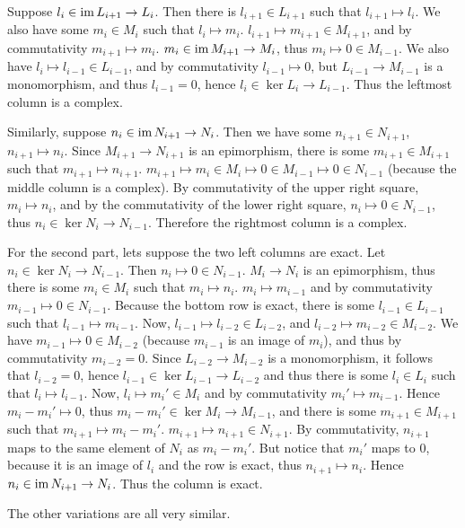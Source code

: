 \begin{solution}
	Suppose $l_i \in \operatorname{im} L_{i+1} \to L_i$. Then there is $l_{i+1} \in L_{i+1}$ such that $l_{i+1} \mapsto l_i$. We also have some $m_i \in M_i$ such that $l_i \mapsto m_i$. $l_{i+1} \mapsto m_{i+1} \in M_{i+1}$, and by commutativity $m_{i+1} \mapsto m_i$. $m_i \in \operatorname{im} M_{i+1} \to M_i$, thus $m_i \mapsto 0 \in M_{i-1}$. We also have $l_i \mapsto l_{i-1} \in L_{i-1}$, and by commutativity $l_{i-1} \mapsto 0$, but $L_{i-1} \to M_{i-1}$ is a monomorphism, and thus $l_{i-1} = 0$, hence $l_i \in \ker L_i \to L_{i-1}$. Thus the leftmost column is a complex.
	
	Similarly, suppose $n_i \in \operatorname{im} N_{i+1} \to N_i$. Then we have some $n_{i+1} \in N_{i+1}$, $n_{i+1} \mapsto n_i$. Since $M_{i+1} \to N_{i+1}$ is an epimorphism, there is some $m_{i+1} \in M_{i+1}$ such that $m_{i+1} \mapsto n_{i+1}$. $m_{i+1} \mapsto m_i \in M_i \mapsto 0 \in M_{i-1} \mapsto 0 \in N_{i-1}$ (because the middle column is a complex). By commutativity of the upper right square, $m_i \mapsto n_i$, and by the commutativity of the lower right square, $n_i \mapsto 0 \in N_{i-1}$, thus $n_i \in \ker N_i \to N_{i-1}$. Therefore the rightmost column is a complex.
	
	For the second part, lets suppose the two left columns are exact. Let $n_i \in \ker N_i \to N_{i-1}$. Then $n_i \mapsto 0 \in N_{i-1}$. $M_i \to N_i$ is an epimorphism, thus there is some $m_i \in M_i$ such that $m_i \mapsto n_i$. $m_i \mapsto m_{i-1}$ and by commutativity $m_{i-1} \mapsto 0 \in N_{i-1}$. Because the bottom row is exact, there is some $l_{i-1} \in L_{i-1}$ such that $l_{i-1} \mapsto m_{i-1}$. Now, $l_{i-1} \mapsto l_{i-2} \in L_{i-2}$, and $l_{i-2} \mapsto m_{i-2} \in M_{i-2}$. We have $m_{i-1} \mapsto 0 \in M_{i-2}$ (because $m_{i-1}$ is an image of $m_i$), and thus by commutativity $m_{i-2} = 0$. Since $L_{i-2} \to M_{i-2}$ is a monomorphism, it follows that $l_{i-2} = 0$, hence $l_{i-1} \in \ker L_{i-1} \to L_{i-2}$ and thus there is some $l_i \in L_i$ such that $l_i \mapsto l_{i-1}$. Now, $l_i \mapsto m_i' \in M_i$ and by commutativity $m_i' \mapsto m_{i-1}$. Hence $m_i - m_i' \mapsto 0$, thus $m_i - m_i' \in \ker M_i \to M_{i-1}$, and there is some $m_{i+1} \in M_{i+1}$ such that $m_{i+1} \mapsto m_i - m_i'$. $m_{i+1} \mapsto n_{i+1} \in N_{i+1}$. By commutativity, $n_{i+1}$ maps to the same element of $N_i$ as $m_i - m_i'$. But notice that $m_i'$ maps to $0$, because it is an image of $l_i$ and the row is exact, thus $n_{i+1} \mapsto n_i$. Hence $n_i \in \operatorname{im} N_{i+1} \to N_i$. Thus the column is exact.
	
	The other variations are all very similar.
\end{solution}
